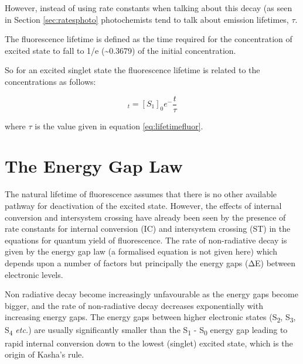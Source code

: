 \documentclass[
]{book}
\begin{document}
However, instead of using rate constants when talking about this decay (as seen in Section \ref{sec:ratesphoto} photochemists tend to talk about emission lifetimes, \(\tau\).

The fluorescence lifetime is defined as the time required for the concentration of excited state to fall to 1/e (\textasciitilde0.3679) of the initial concentration.

So for an excited singlet state the fluorescence lifetime is related to the concentrations as follows:

\begin{equation}
[S_1]_t=[S_1]_0e^-{\frac{t}{\tau}}
\label{eq:fluorlifetime}
\end{equation}

where \(\tau\) is the value given in equation \eqref{eq:lifetimefluor}.

\hypertarget{sec:energygap}{%
\section{The Energy Gap Law}\label{sec:energygap}}

The natural lifetime of fluorescence assumes that there is no other available pathway for deactivation of the excited state. However, the effects of internal conversion and intersystem crossing have already been seen by the presence of rate constants for internal conversion (IC) and intersystem crossing (ST) in the equations for quantum yield of fluorescence. The rate of non-radiative decay is given by the energy gap law (a formalised equation is not given here) which depends upon a number of factors but principally the energy gaps (ΔE) between electronic levels.

Non radiative decay become increasingly unfavourable as the energy gaps become bigger, and the rate of non-radiative decay decreases exponentially with increasing energy gaps. The energy gaps between higher electronic states (S\textsubscript{2}, S\textsubscript{3}, S\textsubscript{4} \emph{etc.}) are usually significantly smaller than the S\textsubscript{1} - S\textsubscript{0} energy gap leading to rapid internal conversion down to the lowest (singlet) excited state, which is the origin of Kasha's rule.
\end{document}
